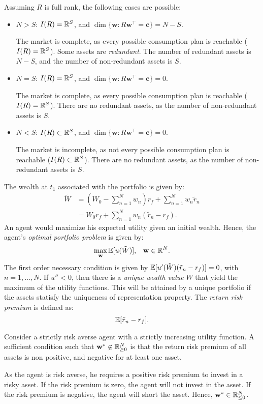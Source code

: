 \documentclass[twoside, titlepage]{article}
\begin{document}
Assuming $R$ is full rank, the following cases are possible:
\begin{itemize}
    \item $N > S$: $I(R) = \mathbb{R}^S$, and $\dim\{\mathbf{w} : R\mathbf{w}^\top = \mathbf{c}\} = N-S$.
    \begin{explanation}
        The market is complete, as every possible consumption plan is reachable ($I(R) = \mathbb{R}^S$). Some assets are \textit{redundant}. The number of redundant assets is $N-S$, and the number of non-redundant assets is $S$.
    \end{explanation}
    \item $N = S$: $I(R) = \mathbb{R}^S$, and $\dim\{\mathbf{w} : R\mathbf{w}^\top = \mathbf{c}\} = 0$.
    \begin{explanation}
        The market is complete, as every possible consumption plan is reachable ($I(R) = \mathbb{R}^S$). There are no redundant assets, as the number of non-redundant assets is $S$.
    \end{explanation}
    \item $N < S$: $I(R) \subset \mathbb{R}^S$, and $\dim\{\mathbf{w} : R\mathbf{w}^\top = \mathbf{c}\} = 0$.
    \begin{explanation}
        The market is incomplete, as not every possible consumption plan is reachable ($I(R) \subset \mathbb{R}^S$). There are no redundant assets, as the number of non-redundant assets is $S$.
    \end{explanation}
\end{itemize}
The wealth at $t_1$ associated with the portfolio is given by:
\begin{align*}
    \tilde{W} &= \left(W_0 - \sum_{n=1}^N w_n\right)r_f + \sum_{n=1}^N w_n \tilde{r}_n \\
    &= W_0r_f + \sum_{n=1}^N w_n(\tilde{r}_n - r_f).
\end{align*} 
An agent would maximize his expected utility given an initial wealth. Hence, the agent's \textit{optimal portfolio problem} is given by:
\[
    \max_{\mathbf{w}} \mathbb{E}[u(\tilde{W})], \;\;\; \mathbf{w} \in \mathbb{R}^N.
\]
The first order necessary condition is given by $\mathbb{E}[u'(\tilde{W})(\tilde{r}_n - r_f)] = 0$, with $n = 1, \dots, N$. If $u'' < 0$, then there is a \textit{unique wealth value} $W$ that yield the maximum of the utility functions. This will be attained by a unique portfolio if the assets statisfy the uniqueness of representation property. The \textit{return risk premium} is defined as:
\[
    \mathbb{E}[\tilde{r}_n - r_f].
\]

\begin{proposition}
    Consider a strictly risk averse agent with a strictly increasing utility function. A sufficient condition such that $\mathbf{w}^* \not\in \mathbb{R}^N_{\geq 0}$ is that the return risk premium of all assets is non positive, and negative for at least one asset.
    \begin{explanation}
        As the agent is risk averse, he requires a positive risk premium to invest in a risky asset. If the risk premium is zero, the agent will not invest in the asset. If the risk premium is negative, the agent will short the asset. Hence, $\mathbf{w}^* \in \mathbb{R}^N_{\leq 0}$.
    \end{explanation}
\end{proposition}
\end{document}
